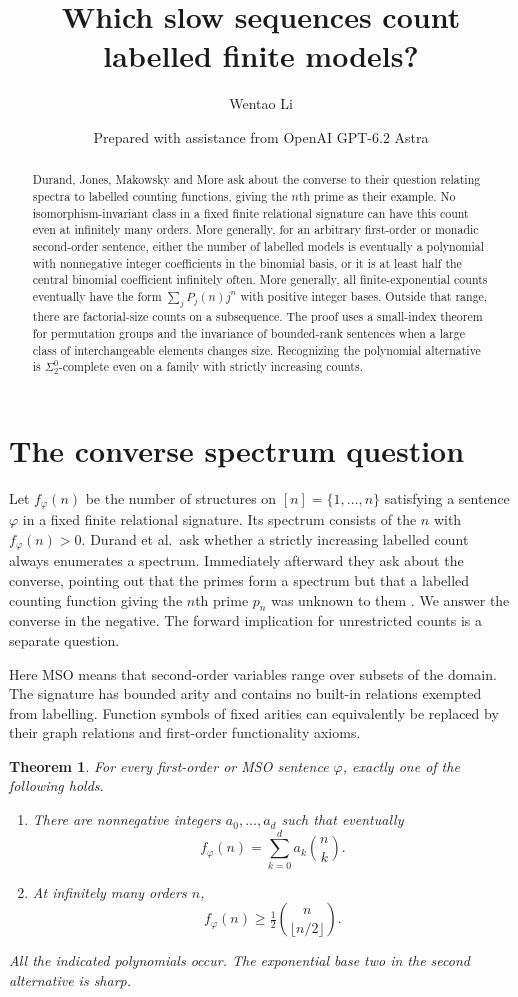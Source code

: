 \documentclass[11pt]{article}
\title{Which slow sequences count labelled finite models?}
\author{Wentao Li}
\date{\small Prepared with assistance from OpenAI GPT-6.2 Astra}
\newtheorem{theorem}{Theorem}
\begin{document}
\maketitle
\begin{abstract}
Durand, Jones, Makowsky and More ask about the converse to their question relating spectra to labelled counting functions, giving the $n$th prime as their example. No isomorphism-invariant class in a fixed finite relational signature can have this count even at infinitely many orders. More generally, for an arbitrary first-order or monadic second-order sentence, either the number of labelled models is eventually a polynomial with nonnegative integer coefficients in the binomial basis, or it is at least half the central binomial coefficient infinitely often. More generally, all finite-exponential counts eventually have the form $\sum_j P_j(n)j^n$ with positive integer bases. Outside that range, there are factorial-size counts on a subsequence. The proof uses a small-index theorem for permutation groups and the invariance of bounded-rank sentences when a large class of interchangeable elements changes size. Recognizing the polynomial alternative is $\Sigma^0_2$-complete even on a family with strictly increasing counts.
\end{abstract}

\section{The converse spectrum question}
Let $f_\varphi(n)$ be the number of structures on $[n]=\{1,\ldots,n\}$ satisfying a sentence $\varphi$ in a fixed finite relational signature. Its spectrum consists of the $n$ with $f_\varphi(n)>0$. Durand et al.\ ask whether a strictly increasing labelled count always enumerates a spectrum. Immediately afterward they ask about the converse, pointing out that the primes form a spectrum but that a labelled counting function giving the $n$th prime $p_n$ was unknown to them \cite[Section 3.3, p. 515]{djmm}. We answer the converse in the negative. The forward implication for unrestricted counts is a separate question.

Here MSO means that second-order variables range over subsets of the domain. The signature has bounded arity and contains no built-in relations exempted from labelling. Function symbols of fixed arities can equivalently be replaced by their graph relations and first-order functionality axioms.

\begin{theorem}\label{main}
For every first-order or MSO sentence $\varphi$, exactly one of the following holds.
\begin{enumerate}
\item There are nonnegative integers $a_0,\ldots,a_d$ such that eventually
\[
                         f_\varphi(n)=\sum_{k=0}^d a_k\binom nk .
\]
\item At infinitely many orders $n$,
\[
                     f_\varphi(n)\ge \tfrac12\binom n{\lfloor n/2\rfloor}.
\]
\end{enumerate}
All the indicated polynomials occur. The exponential base two in the second alternative is sharp.
\end{theorem}
\end{document}
